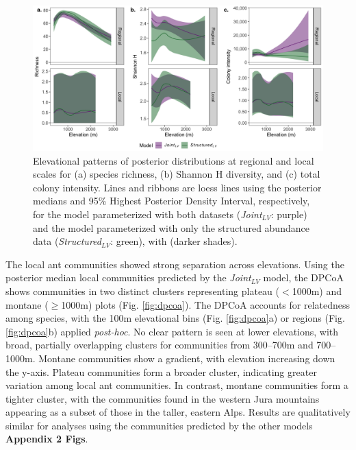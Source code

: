 \documentclass[preprint,review,times,12pt]{elsarticle}
\begin{document}
\begin{figure}
	\centering\includegraphics[width=6in]{ms/1_Ecography/1/figs/el_patterns_LV.png}
	\caption{\label{fig:el_patterns} Elevational patterns of posterior distributions at regional and local scales for (a) species richness, (b) Shannon H diversity, and (c) total colony intensity. Lines and ribbons are loess lines using the posterior medians and 95\% Highest Posterior Density Interval, respectively, for the model parameterized with both datasets (\emph{Joint}$_{LV}$: purple) and the model parameterized with only the structured abundance data (\emph{Structured}$_{LV}$: green), with (darker shades). }
\end{figure}

The local ant communities showed strong separation across elevations. Using the posterior median local communities predicted by the \emph{Joint}$_{LV}$ model, the DPCoA shows communities in two distinct clusters representing plateau ($<$1000m) and montane ($\geq$1000m) plots (Fig. \ref{fig:dpcoa}). The DPCoA accounts for relatedness among species, with the 100m elevational bins (Fig. \ref{fig:dpcoa}a) or regions (Fig. \ref{fig:dpcoa}b) applied \emph{post-hoc}. No clear pattern is seen at lower elevations, with broad, partially overlapping clusters for communities from 300–700m and 700–1000m. Montane communities show a gradient, with elevation increasing down the y-axis. Plateau communities form a broader cluster, indicating greater variation among local ant communities. In contrast, montane communities form a tighter cluster, with the communities found in the western Jura mountains appearing as a subset of those in the taller, eastern Alps. Results are qualitatively similar for analyses using the communities predicted by the other models \textbf{Appendix 2 Figs}.
\end{document}
